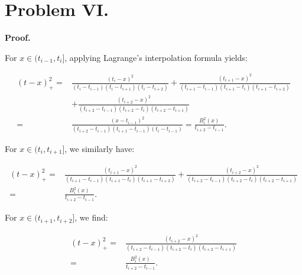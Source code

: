 \documentclass[a4paper]{article}
\renewcommand{\qed}{\hfill \boxed{\mathbb{Q.E.D.}}}
\begin{document}
\begin{center}
\end{center}

\qed

\section*{Problem VI.}

\textbf{Proof.}


For \( x \in (t_{i-1}, t_i] \), applying Lagrange's interpolation formula yields:

\begin{align*}
    [t_{i-1}, t_i, t_{i+1}, t_{i+2}](t - x)_+^2 = & \frac{(t_i - x)^2}{(t_i - t_{i-1})(t_i - t_{i+1})(t_i - t_{i+2})} + \frac{(t_{i+1} - x)^2}{(t_{i+1} - t_{i-1})(t_{i+1} - t_i)(t_{i+1} - t_{i+2})} \\
    & + \frac{(t_{i+2} - x)^2}{(t_{i+2} - t_{i-1})(t_{i+2} - t_i)(t_{i+2} - t_{i+1})} \\
    = & \frac{(x - t_{i-1})^2}{(t_{i+2} - t_{i-1})(t_{i+1} - t_{i-1})(t_i - t_{i-1})} = \frac{B_i^2(x)}{t_{i+2} - t_{i-1}}.
\end{align*}

For \( x \in (t_i, t_{i+1}] \), we similarly have:

\begin{align*}
    [t_{i-1}, t_i, t_{i+1}, t_{i+2}](t - x)_+^2 = & \frac{(t_{i+1} - x)^2}{(t_{i+1} - t_{i-1})(t_{i+1} - t_i)(t_{i+1} - t_{i+2})} + \frac{(t_{i+2} - x)^2}{(t_{i+2} - t_{i-1})(t_{i+2} - t_i)(t_{i+2} - t_{i+1})} \\
    = & \frac{B_i^2(x)}{t_{i+2} - t_{i-1}}.
\end{align*}

For \( x \in (t_{i+1}, t_{i+2}] \), we find:

\begin{align*}
    [t_{i-1}, t_i, t_{i+1}, t_{i+2}](t - x)_+^2 = & \frac{(t_{i+2} - x)^2}{(t_{i+2} - t_{i-1})(t_{i+2} - t_i)(t_{i+2} - t_{i+1})} \\
    = & \frac{B_i^2(x)}{t_{i+2} - t_{i-1}}.
\end{align*}
\end{document}
